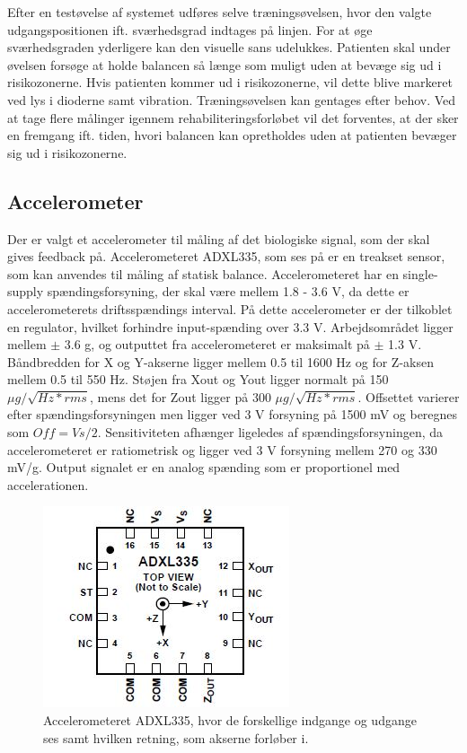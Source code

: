 Efter en testøvelse af systemet udføres selve træningsøvelsen, hvor den valgte udgangspositionen ift. sværhedsgrad indtages på linjen. For at øge sværhedsgraden yderligere kan den visuelle sans udelukkes. Patienten skal under øvelsen forsøge at holde balancen så længe som muligt uden at bevæge sig ud i risikozonerne. Hvis patienten kommer ud i risikozonerne, vil dette blive markeret ved lys i dioderne samt vibration. Træningsøvelsen kan gentages efter behov. Ved at tage flere målinger igennem rehabiliteringsforløbet vil det forventes, at der sker en fremgang ift. tiden, hvori balancen kan opretholdes uden at patienten bevæger sig ud i risikozonerne. 

\subsection{Accelerometer}
Der er valgt et accelerometer til måling af det biologiske signal, som der skal gives feedback på. Accelerometeret ADXL335, som ses på  er en treakset sensor, som kan anvendes til måling af statisk balance. Accelerometeret har en single-supply spændingsforsyning, der skal være mellem 1.8 - 3.6 V, da dette er accelerometerets driftsspændings interval. På dette accelerometer er der tilkoblet en regulator, hvilket forhindre input-spænding over 3.3 V.  Arbejdsområdet ligger mellem $\pm$ 3.6 g, og outputtet fra accelerometeret er maksimalt på $\pm$ 1.3 V. Båndbredden for X og Y-akserne ligger mellem 0.5 til 1600 Hz og for Z-aksen mellem 0.5 til 550 Hz. Støjen fra Xout og Yout ligger normalt på 150 $\mu g/\sqrt{Hz * rms}$, mens det for Zout ligger på 300 $\mu g/\sqrt{Hz * rms}$. Offsettet varierer efter spændingsforsyningen men ligger ved 3 V forsyning på 1500 mV og beregnes som $Off = Vs/2$. Sensitiviteten afhænger ligeledes af spændingsforsyningen, da accelerometeret er ratiometrisk og ligger ved 3 V forsyning mellem 270 og 330 mV/g. Output signalet er en analog spænding som er proportionel med accelerationen. \cite{Devices2009} %

\begin{figure}[H]
	\centering 
	\includegraphics[scale=0.9]{figures/cProblemloesning/ADXL335.JPG}
	\caption{Accelerometeret ADXL335, hvor de forskellige indgange og udgange ses samt hvilken retning, som akserne forløber i. \cite{Devices2009}}
	\label{ADXL335}
\end{figure}

